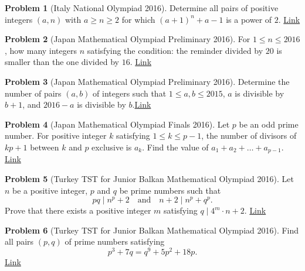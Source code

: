 \documentclass[]{article}
\theoremstyle{definition}
\newtheorem{problem}{Problem}
\begin{document}
\begin{problem}[Italy National Olympiad 2016]
	Determine all pairs of positive integers $(a,n)$ with $a\ge n\ge 2$ for which $(a+1)^n+a-1$ is a power of $2$. \hfill \href{http://artofproblemsolving.com/community/c6h1241079p6338542}{Link}
\end{problem}




\begin{problem}[Japan Mathematical Olympiad Preliminary 2016]
	For $1\leq n\leq 2016$, how many integers $n$ satisfying the condition: the reminder divided by $20$ is smaller than the one divided by $16$. \hfill \href{http://artofproblemsolving.com/community/c6h1195499p5852489}{Link}
\end{problem}





\begin{problem}[Japan Mathematical Olympiad Preliminary 2016]
	Determine the number of pairs $(a, b)$ of integers such that $1 \leq a, b \leq 2015$, $a$ is divisible by $b + 1$, and $2016 - a$ is divisible by $b$.\href{http://artofproblemsolving.com/community/c6h1195508p5852517}{Link}
\end{problem}




\begin{problem}[Japan Mathematical Olympiad Finals 2016]
	Let $p$ be an odd prime number. For positive integer $k$ satisfying $1\le k\le p-1$, the number of divisors of $kp+1$ between $k$ and $p$ exclusive is $a_k$. Find the value of $a_1+a_2+\ldots + a_{p-1}$. \hfill \href{http://artofproblemsolving.com/community/c6h1225510p6158692}{Link}
\end{problem}




\begin{problem}[Turkey TST for Junior Balkan Mathematical Olympiad 2016]
	Let $n$ be a positive integer, $p$ and $q$ be prime numbers such that
	\[ pq \mid n^p+2 \quad \text{and} \quad n+2 \mid n^p+q^p. \] Prove that there exists a positive integer $m$ satisfying $q \mid 4^m \cdot n +2$. \hfill \href{http://artofproblemsolving.com/community/c6h1246256p6393813}{Link}
\end{problem}



\begin{problem}[Turkey TST for Junior Balkan Mathematical Olympiad 2016]
	Find all pairs $(p, q)$ of prime numbers satisfying
	\[ p^3+7q=q^9+5p^2+18p. \]
	\flushright \href{http://artofproblemsolving.com/community/c6h1246266p6393971}{Link}
\end{problem}
\end{document}
